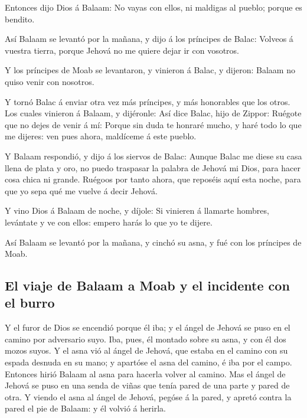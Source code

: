  Entonces dijo Dios á Balaam: No vayas con ellos, ni
maldigas al pueblo; porque es bendito.

 Así Balaam se levantó por la mañana, y dijo á los
príncipes de Balac: Volveos á vuestra tierra, porque Jehová no me quiere
dejar ir con vosotros.

 Y los príncipes de Moab se levantaron, y vinieron á
Balac, y dijeron: Balaam no quiso venir con nosotros.

 Y tornó Balac á enviar otra vez más príncipes, y más
honorables que los otros.  Los cuales vinieron á Balaam,
y dijéronle: Así dice Balac, hijo de Zippor: Ruégote que no dejes de
venir á mí:  Porque sin duda te honraré mucho, y haré
todo lo que me dijeres: ven pues ahora, maldíceme á este pueblo.

 Y Balaam respondió, y dijo á los siervos de Balac:
Aunque Balac me diese su casa llena de plata y oro, no puedo traspasar
la palabra de Jehová mi Dios, para hacer cosa chica ni grande.
 Ruégoos por tanto ahora, que reposéis aquí esta noche,
para que yo sepa qué me vuelve á decir Jehová.

 Y vino Dios á Balaam de noche, y díjole: Si vinieren á
llamarte hombres, levántate y ve con ellos: empero harás lo que yo te
dijere.

 Así Balaam se levantó por la mañana, y cinchó su asna, y
fué con los príncipes de Moab.

\hypertarget{el-viaje-de-balaam-a-moab-y-el-incidente-con-el-burro}{%
\subsection{El viaje de Balaam a Moab y el incidente con el
burro}\label{el-viaje-de-balaam-a-moab-y-el-incidente-con-el-burro}}

 Y el furor de Dios se encendió porque él iba; y el ángel
de Jehová se puso en el camino por adversario suyo. Iba, pues, él
montado sobre su asna, y con él dos mozos suyos.  Y el
asna vió al ángel de Jehová, que estaba en el camino con su espada
desnuda en su mano; y apartóse el asna del camino, é iba por el campo.
Entonces hirió Balaam al asna para hacerla volver al camino.
 Mas el ángel de Jehová se puso en una senda de viñas que
tenía pared de una parte y pared de otra.  Y viendo el
asna al ángel de Jehová, pegóse á la pared, y apretó contra la pared el
pie de Balaam: y él volvió á herirla.

